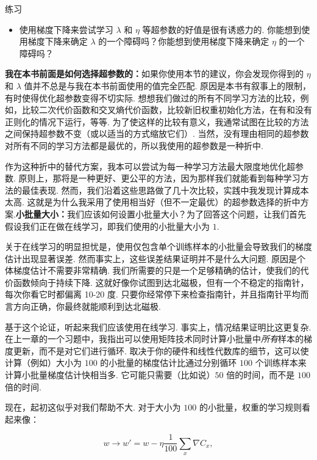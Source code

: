 \begin{exerciseBox}{练习}

\begin{itemize}

\item 使用梯度下降来尝试学习 $\lambda$ 和 $\eta$ 等超参数的好值是很有诱惑力的. 你能想到使用梯度下降来确定 $\lambda$ 的一个障碍吗？你能想到使用梯度下降来确定 $\eta$ 的一个障碍吗？

\end{itemize}

\textbf{我在本书前面是如何选择超参数的：}如果你使用本节的建议，你会发现你得到的 $\eta$ 和 $\lambda$ 值并不总是与我在本书前面使用的值完全匹配. 原因是本书有叙事上的限制，有时使得优化超参数变得不切实际. 想想我们做过的所有不同学习方法的比较，例如，比较二次代价函数和交叉熵代价函数，比较新旧权重初始化方法，在有和没有正则化的情况下运行，等等. 为了使这样的比较有意义，我通常试图在比较的方法之间保持超参数不变（或以适当的方式缩放它们）. 当然，没有理由相同的超参数对所有不同的学习方法都是最优的，所以我使用的超参数是一种折中.

作为这种折中的替代方案，我本可以尝试为每一种学习方法最大限度地优化超参数. 原则上，那将是一种更好、更公平的方法，因为那样我们就能看到每种学习方法的最佳表现. 然而，我们沿着这些思路做了几十次比较，实践中我发现计算成本太高. 这就是为什么我采用了使用相当好（但不一定最优）的超参数选择的折中方案.\textbf{小批量大小：}我们应该如何设置小批量大小？为了回答这个问题，让我们首先假设我们正在做在线学习，即我们使用的小批量大小为 $1$.

关于在线学习的明显担忧是，使用仅包含单个训练样本的小批量会导致我们的梯度估计出现显著误差. 然而事实上，这些误差结果证明并不是什么大问题. 原因是个体梯度估计不需要非常精确. 我们所需要的只是一个足够精确的估计，使我们的代价函数倾向于持续下降. 这就好像你试图到达北磁极，但有一个不稳定的指南针，每次你看它时都偏离 10-20 度. 只要你经常停下来检查指南针，并且指南针平均而言方向正确，你最终就能顺利到达北磁极.

基于这个论证，听起来我们应该使用在线学习. 事实上，情况结果证明比这更复杂. 在上一章的一个习题中，我指出可以使用矩阵技术同时计算小批量中\emph{所有}样本的梯度更新，而不是对它们进行循环. 取决于你的硬件和线性代数库的细节，这可以使计算（例如）大小为 $100$ 的小批量的梯度估计比通过分别循环 $100$ 个训练样本来计算小批量梯度估计快相当多. 它可能只需要（比如说）$50$ 倍的时间，而不是 $100$ 倍的时间.

现在，起初这似乎对我们帮助不大. 对于大小为 $100$ 的小批量，权重的学习规则看起来像：

\begin{equation}
w \rightarrow w' = w-\eta \frac{1}{100} \sum_x \nabla C_x,
\tag{100}
\end{equation}


\end{exerciseBox}
